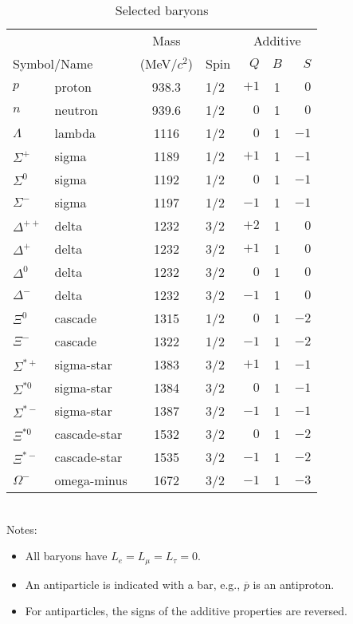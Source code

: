 \begin{table}[htbp]
\caption{Selected baryons}
\label{table:baryons}
\begin{tabular}[tbp]{llclrcr}
&& Mass && \multicolumn{3}{|c}{Additive} \\
\multicolumn{2}{l}{Symbol/Name} & (MeV/$c^2$) & Spin\hspace{4mm} &
\multicolumn{1}{|r}{$Q$}
 & $B$ & $S$ \\
\hline\hline
$p$           & proton       & 938.3 & 1/2 & $+1$ & 1 & $0$  \\
$n$           & neutron      & 939.6 & 1/2 & $ 0$ & 1 & $0$  \\[0.5ex]
$\Lambda$     & lambda       & 1116  & 1/2 & $ 0$ & 1 & $-1$ \\
$\Sigma^+$    & sigma        & 1189  & 1/2 & $+1$ & 1 & $-1$ \\
$\Sigma^0$    & sigma        & 1192  & 1/2 & $ 0$ & 1 & $-1$ \\
$\Sigma^-$    & sigma        & 1197  & 1/2 & $-1$ & 1 & $-1$ \\[0.5ex]
$\Delta^{++}$ & delta        & 1232  & 3/2 & $+2$ & 1 & $ 0$ \\
$\Delta^+$    & delta        & 1232  & 3/2 & $+1$ & 1 & $ 0$ \\
$\Delta^0$    & delta        & 1232  & 3/2 & $ 0$ & 1 & $ 0$ \\
$\Delta^-$    & delta        & 1232  & 3/2 & $-1$ & 1 & $ 0$ \\[0.5ex]
$\Xi^0$       & cascade      & 1315  & 1/2 & $ 0$ & 1 & $-2$ \\
$\Xi^-$       & cascade      & 1322  & 1/2 & $-1$ & 1 & $-2$ \\[0.5ex]
$\Sigma^{*+}$ & sigma-star   & 1383  & 3/2 & $+1$ & 1 & $-1$ \\
$\Sigma^{*0}$ & sigma-star   & 1384  & 3/2 & $ 0$ & 1 & $-1$ \\
$\Sigma^{*-}$ & sigma-star   & 1387  & 3/2 & $-1$ & 1 & $-1$ \\[0.5ex]
$\Xi^{*0}$    & cascade-star & 1532  & 3/2 & $ 0$ & 1 & $-2$ \\
$\Xi^{*-}$    & cascade-star & 1535  & 3/2 & $-1$ & 1 & $-2$ \\
$\Omega^-$    & omega-minus  & 1672  & 3/2 & $-1$ & 1 & $-3$ \\
\hline
\end{tabular}\\[0.5ex]
Notes:
\begin{itemize}
\item All baryons have $L_e = L_\mu = L_\tau = 0$.
\item An antiparticle is indicated with a bar, e.g.,
$\overline p$ is an antiproton.
\item For antiparticles, the signs of the additive properties are reversed.
\end{itemize}
\end{table}

